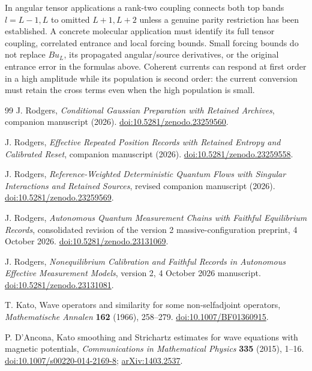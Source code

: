 \documentclass[11pt]{article}
\numberwithin{equation}{section}
\theoremstyle{definition}
\theoremstyle{remark}
\begin{document}
In angular tensor applications a rank-two coupling connects both
top bands $l=L-1,L$ to omitted $L+1,L+2$ unless a genuine parity
restriction has been established. A concrete molecular application
must identify its full tensor coupling, correlated entrance and local
forcing bounds. Small forcing bounds do not replace
$Bu_L$, its propagated angular/source derivatives, or the original
entrance error in the formulas above. Coherent currents can respond
at first order in a high amplitude while its population is second
order: the current conversion must retain the cross terms even when
the high population is small.

\clearpage
\begin{thebibliography}{99}
J. Rodgers, \emph{Conditional Gaussian Preparation with Retained Archives},
companion manuscript (2026).
\href{https://doi.org/10.5281/zenodo.23259560}{doi:10.5281/zenodo.23259560}.

J. Rodgers, \emph{Effective Repeated Position Records with Retained Entropy
and Calibrated Reset}, companion manuscript (2026).
\href{https://doi.org/10.5281/zenodo.23259558}{doi:10.5281/zenodo.23259558}.

J. Rodgers, \emph{Reference-Weighted Deterministic Quantum Flows with
Singular Interactions and Retained Sources}, revised companion manuscript (2026).
\href{https://doi.org/10.5281/zenodo.23259569}{doi:10.5281/zenodo.23259569}.

J. Rodgers, \emph{Autonomous Quantum Measurement Chains with Faithful
Equilibrium Records}, consolidated revision of the version 2
massive-configuration preprint, 4 October 2026.
\href{https://doi.org/10.5281/zenodo.23131069}{doi:10.5281/zenodo.23131069}.

J. Rodgers, \emph{Nonequilibrium Calibration and Faithful Records in
Autonomous Effective Measurement Models}, version 2, 4 October 2026 manuscript.
\href{https://doi.org/10.5281/zenodo.23131081}{doi:10.5281/zenodo.23131081}.

T. Kato, Wave operators and similarity for some non-selfadjoint operators,
\emph{Mathematische Annalen} \textbf{162} (1966), 258--279.
\href{https://doi.org/10.1007/BF01360915}{doi:10.1007/BF01360915}.

P. D'Ancona, Kato smoothing and Strichartz estimates for wave equations with magnetic potentials,
\emph{Communications in Mathematical Physics} \textbf{335} (2015), 1--16.
\href{https://doi.org/10.1007/s00220-014-2169-8}{doi:10.1007/s00220-014-2169-8};
\href{https://arxiv.org/abs/1403.2537}{arXiv:1403.2537}.


\end{thebibliography}
\end{document}
